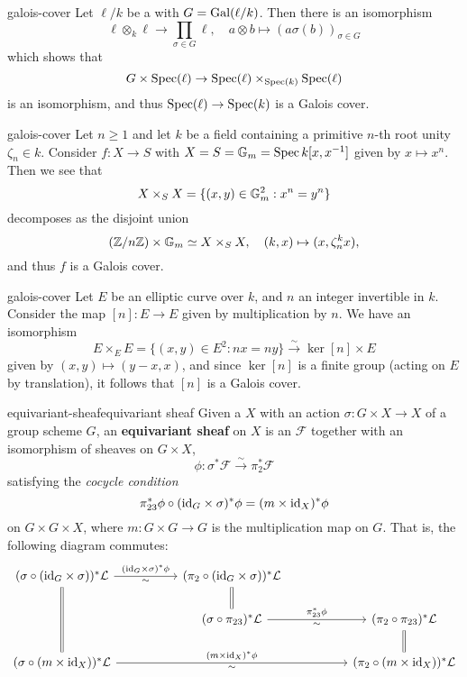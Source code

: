 \begin{example}{galois-cover}
    Let $\ell / k$ be a  with  $G = \textup{Gal}(\ell/k)$. Then there is an isomorphism
    \[ \ell \otimes_k \ell \to \prod_{\sigma \in G} \ell, \quad a \otimes b \mapsto (a \sigma(b))_{\sigma \in G} \]
    which shows that
    \[ G \times \operatorname{Spec}(\ell) \to \operatorname{Spec}(\ell) \times_{\operatorname{Spec}(k)} \operatorname{Spec}(\ell) \]
    is an isomorphism, and thus $\operatorname{Spec}(\ell) \to \operatorname{Spec}(k)$ is a Galois cover.
\end{example}

\begin{example}{galois-cover}
    Let $n \ge 1$ and let $k$ be a field containing a primitive $n$-th root unity $\zeta_n \in k$. Consider $f : X \to S$ with $X = S = \mathbb{G}_m = \operatorname{Spec} k[x, x^{-1}]$ given by $x \mapsto x^n$. Then we see that
    \[ X \times_S X = \{ (x, y) \in \mathbb{G}_m^2 : x^n = y^n \} \]
    decomposes as the disjoint union
    \[ (\mathbb{Z}/n\mathbb{Z}) \times \mathbb{G}_m \simeq X \times_S X, \quad (k, x) \mapsto (x, \zeta_n^k x) , \]
    and thus $f$ is a Galois cover.
\end{example}

\begin{example}{galois-cover}
    Let $E$ be an elliptic curve over $k$, and $n$ an integer invertible in $k$. Consider the map $[n] : E \to E$ given by multiplication by $n$. We have an isomorphism
    \[ E \times_E E = \{ (x, y) \in E^2 : nx = ny \} \xrightarrow{\sim} \ker [n] \times E \]
    given by $(x, y) \mapsto (y - x, x)$, and since $\ker [n]$ is a finite group (acting on $E$ by translation), it follows that $[n]$ is a Galois cover.
\end{example}

\begin{topic}{equivariant-sheaf}{equivariant sheaf}
    Given a  $X$ with an action $\sigma : G \times X \to X$ of a group scheme $G$, an \textbf{equivariant sheaf} on $X$ is an  $\mathcal{F}$ together with an isomorphism of sheaves on $G \times X$,
    \[ \phi : \sigma^* \mathcal{F} \xrightarrow{\sim} \pi_2^* \mathcal{F} \]
    satisfying the \textit{cocycle condition}
    \[ \pi_{23}^* \phi \circ (\text{id}_G \times \sigma)^* \phi = (m \times \text{id}_X)^* \phi \]
    on $G \times G \times X$, where $m : G \times G \to G$ is the multiplication map on $G$. That is, the following diagram commutes:
    \[ \begin{tikzcd}[column sep=5em]
        (\sigma \circ (\id_G \times \sigma))^* \mathcal{L} \arrow["\sim{}"']{r}{(\id_G \times \sigma)^* \phi} \arrow[equal]{dd} & (\pi_2 \circ (\id_G \times \sigma))^* \mathcal{L} \arrow[equal]{d} & \\ & (\sigma \circ \pi_{23})^* \mathcal{L} \arrow["\sim{}"']{r}{\pi_{23}^* \phi} & (\pi_2 \circ \pi_{23})^* \mathcal{L} \arrow[equal]{d} \\ (\sigma \circ (m \times \id_X))^* \mathcal{L} \arrow["\sim{}"']{rr}{(m \times \id_X)^* \phi} & & (\pi_2 \circ (m \times \id_X))^* \mathcal{L}
    \end{tikzcd} \]
\end{topic}

